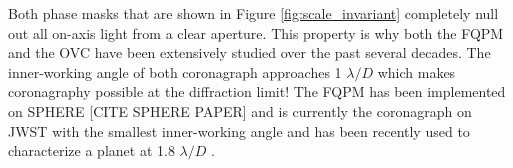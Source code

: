 \documentclass[letterpaper]{ar-1col}
\newcommand{\commentehp}[1]{\textcolor{red}{[EHP: #1]}}
\newcommand{\commentsyh}[1]{\textcolor{red}{[SYH: #1]}}
\begin{document}
Both phase masks that are shown in Figure \ref{fig:scale_invariant} completely null out all on-axis light from a clear aperture. This property is why both the FQPM and the OVC have been extensively studied over the past several decades. The inner-working angle of both coronagraph approaches 1 $\lambda/D$ which makes coronagraphy possible at the diffraction limit! The FQPM has been implemented on SPHERE [CITE SPHERE PAPER] and is currently the coronagraph on JWST with the smallest inner-working angle and has been recently used to characterize a planet at 1.8 $\lambda/D$ \cite{franson2024jwst}. 
 
%

%
%
%

%


\end{document}
